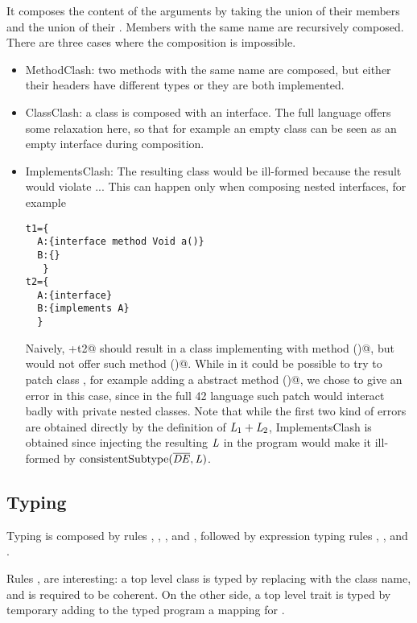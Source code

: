 It composes the content of the arguments
by taking the union of their members and the union of their \Q@implements@.
Members with the same name are recursively composed.
There are three cases where the composition is impossible.
\begin{itemize}
\item MethodClash: two methods with the same name are composed,
but either their headers have different types or they are both implemented.
\item ClassClash: a class is composed with an interface.
The full language offers some relaxation here, so that for example an empty class can be seen as an empty interface during composition.
\item ImplementsClash:
The resulting class would be ill-formed because the 
result would violate ...
This can happen only when composing nested interfaces,
for example
\begin{lstlisting}
t1={
  A:{interface method Void a()}
  B:{}
   }
t2={
  A:{interface}
  B:{implements A}
  }
\end{lstlisting}
Naively, +t2@ should result in a class \Q@B@ implementing \Q@A@ with method \Q@a()@,
but \Q@B@ would not offer such method \Q@a()@.
While in \name it could be possible to try to patch class \Q@B@, for example adding a
abstract method \Q@a()@, we chose to give an error in this case, since in the full 42 language
such patch would interact badly with private nested classes.
Note that while the first two kind of errors are obtained directly by the definition of 
$\mathit{L}_1+\mathit{L}_2$, ImplementsClash is obtained since injecting the resulting 
$\mathit{L}$ in the program would make it ill-formed by 
$\text{consistentSubtype}(\overline{\mathit{DE}},\mathit{L})$.
\end{itemize}

\subsection{Typing}
Typing is composed by rules , ,
,
 and ,
followed by expression typing rules
, ,  and .

Rules , 
are interesting: a top level class is typed by replacing \Q@This@ with the class name,
and is required to be coherent.
On the other side, a top level trait is typed by temporary adding to the typed program a mapping for
\Q@This@.

